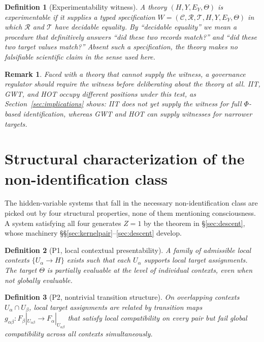 \documentclass[11pt]{article}
\newtheorem{definition}{Definition}
\newtheorem{remark}{Remark}
\begin{document}
\begin{definition}[Experimentability witness]
\label{def:witness}
A theory $(H, Y, E_Y, \Theta)$ is \emph{experimentable} if it supplies a
typed specification
$W = (\mathcal{C}, \mathcal{R}, \mathcal{T}, H, Y, E_Y, \Theta)$
in which $\mathcal{R}$ and $\mathcal{T}$ have decidable equality.
By ``decidable equality'' we mean a procedure that definitively answers
``did these two records match?'' and ``did these two target values match?''
Absent such a specification, the theory makes no falsifiable scientific claim
in the sense used here.
\end{definition}

\begin{remark}
Faced with a theory that cannot supply the witness, a governance regulator
should require the witness before deliberating about the theory at all. IIT,
GWT, and HOT occupy different positions under this test, as
Section~\ref{sec:implications} shows: IIT does not yet supply the witness for
full $\Phi$-based identification, whereas GWT and HOT can supply witnesses for
narrower targets.
\end{remark}

\section{Structural characterization of the non-identification class}
\label{sec:characterization}

The hidden-variable systems that fall in the necessary non-identification class
are picked out by four structural properties, none of them mentioning
consciousness. A system satisfying all four generates $Z = 1$ by the theorem in
\S\ref{sec:descent}, whose machinery \S\S\ref{sec:kernelpair}--\ref{sec:descent}
develop.

\begin{definition}[P1, local contextual presentability]
A family of admissible local contexts $\{U_\alpha \to H\}$ exists such that
each $U_\alpha$ supports local target assignments.
The target $\Theta$ is partially evaluable at the level of individual contexts,
even when not globally evaluable.
\end{definition}

\begin{definition}[P2, nontrivial transition structure]
On overlapping contexts $U_\alpha \cap U_\beta$, local target assignments are
related by transition maps
$g_{\alpha\beta} : F_\beta|_{U_{\alpha\beta}} \to F_\alpha|_{U_{\alpha\beta}}$
that satisfy local compatibility on every pair but fail global compatibility
across all contexts simultaneously.
\end{definition}
\end{document}
